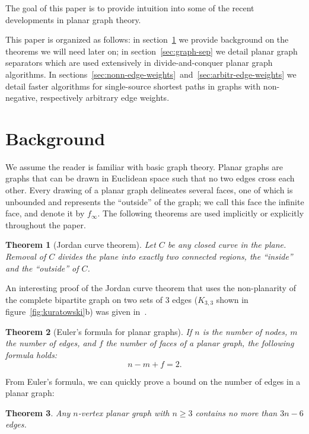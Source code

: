 \documentclass[11pt]{article}
\newtheorem{theorem}{Theorem}[section]
\begin{document}
The goal of this paper is to provide intuition into some of the recent developments in planar graph theory.

This paper is organized as follows: in section~\ref{sec:background} we provide background on the theorems we will need later on; in section~\ref{sec:graph-sep} we detail planar graph separators which are used extensively in divide-and-conquer planar graph algorithms. In sections~\ref{sec:nonn-edge-weights}~and~\ref{sec:arbitr-edge-weights} we detail faster algorithms for single-source shortest paths in graphs with non-negative, respectively arbitrary edge weights.

\section{Background}
\label{sec:background}

We assume the reader is familiar with basic graph theory. Planar graphs are graphs that can be drawn in Euclidean space such that no two edges cross each other. Every drawing of a planar graph delineates several faces, one of which is unbounded and represents the ``outside'' of the graph; we call this face the infinite face, and denote it by $f_{\infty}$. The following theorems are used implicitly or explicitly throughout the paper.\\

\begin{theorem}[Jordan curve theorem]
  Let $C$ be any closed curve in the plane. Removal of $C$ divides the plane into exactly two connected regions, the ``inside'' and the ``outside'' of $C$.
\end{theorem}

An interesting proof of the Jordan curve theorem that uses the non-planarity of the complete bipartite graph on two sets of 3 edges ($K_{3,3}$ shown in figure~\ref{fig:kuratowski}b) was given in~\cite{thomassen1992jordan}.\\

\begin{theorem}[Euler's formula for planar graphs]
  If $n$ is the number of nodes, $m$ the number of edges, and $f$ the number of faces of a planar graph, the following formula holds:
\[
  n - m + f = 2.
\]
\end{theorem}

From Euler's formula, we can quickly prove a bound on the number of edges in a planar graph:\\

\begin{theorem}
  Any $n$-vertex planar graph with $n \geq 3$ contains no more than $3n-6$ edges.\\
\end{theorem}
\end{document}
